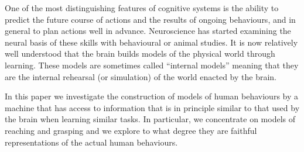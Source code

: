 One of the most distinguishing features of cognitive systems is the
ability to predict the future course of actions and the results of
ongoing behaviours, and in general to plan actions well in advance.
Neuroscience has started examining the neural basis of these skills
with behavioural or animal studies. It is now relatively well
understood that the brain builds models of the physical world through
learning. These models are sometimes called ``internal models''
meaning that they are the internal rehearsal (or simulation) of the
world enacted by the brain.

In this paper we investigate the construction of models of human
behaviours by a machine that has access to information that is in
principle similar to that used by the brain when learning similar
tasks. In particular, we concentrate on models of reaching and
grasping and we explore to what degree they are faithful
representations of the actual human behaviours.
